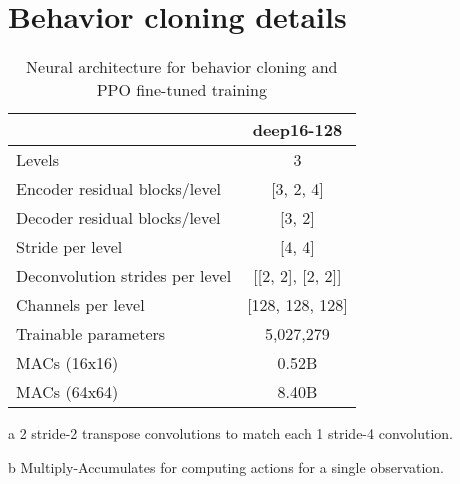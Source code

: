 \documentclass[conference]{IEEEtran}
\newcounter{supptable}
\newenvironment{supptable}
  {\renewcommand{\tablename}{Supplemental Table}\setcounter{table}{\value{supptable}}\addtocounter{supptable}{1}\begin{table}}
  {\end{table}\setcounter{supptable}{\value{table}}}
\begin{document}
\section{Behavior cloning details}
\label{appendix:behavior-cloning-details}
\begin{supptable}[H]
    \centering
    \begin{threeparttable}
    \caption{Neural architecture for behavior cloning and PPO fine-tuned training}
    \label{tab:bc-architecture}
    \begin{tabular}{lc}
    \toprule
                                 & deep16-128 \\
    \midrule
    Levels                      & 3  \\
    Encoder residual blocks/level & [3, 2, 4] \\
    Decoder residual blocks/level & [3, 2] \\
    Stride per level            & [4, 4] \\
    Deconvolution strides per level & [[2, 2], [2, 2]]\tnote{a}\\
    Channels per level          & [128, 128, 128] \\
    Trainable parameters        & 5,027,279 \\
    MACs\tnote{b} (16x16)          & 0.52B \\
    MACs\tnote{b} (64x64)          & 8.40B \\
    \bottomrule
    \end{tabular}
    \begin{tablenotes}
       \item[a] 2 stride-2 transpose convolutions to match each 1 stride-4 convolution.
       \item[b] Multiply-Accumulates for computing actions for a single observation.
    \end{tablenotes}
    \end{threeparttable}
\end{supptable}
\end{document}

